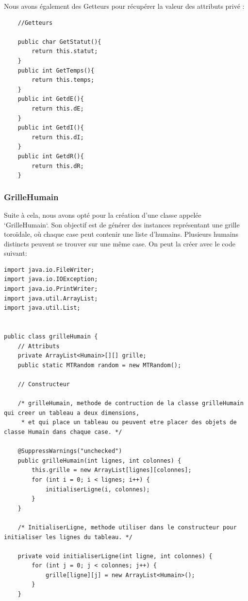 \documentclass[french]{article}
\begin{document}
Nous avons également des Getteurs pour récupérer la valeur des attributs privé :

\begin{lstlisting}
    //Getteurs

    public char GetStatut(){
        return this.statut;
    }
    public int GetTemps(){
        return this.temps;
    }
    public int GetdE(){
        return this.dE;
    }
    public int GetdI(){
        return this.dI;
    }
    public int GetdR(){
        return this.dR;
    }
\end{lstlisting}

\subsubsection{GrilleHumain}

Suite à cela, nous avons opté pour la création d'une classe appelée `GrilleHumain`. Son objectif est de générer des instances représentant une grille toroïdale, où chaque case peut contenir une liste d'humains. Plusieurs humains distincts peuvent se trouver sur une même case.
On peut la créer avec le code suivant:
\begin{lstlisting}
import java.io.FileWriter;
import java.io.IOException;
import java.io.PrintWriter;
import java.util.ArrayList;
import java.util.List;


public class grilleHumain {
    // Attributs
    private ArrayList<Humain>[][] grille;
    public static MTRandom random = new MTRandom();

    // Constructeur

    /* grilleHumain, methode de contruction de la classe grilleHumain qui creer un tableau a deux dimensions,
     * et qui place un tableau ou peuvent etre placer des objets de classe Humain dans chaque case. */

    @SuppressWarnings("unchecked")
    public grilleHumain(int lignes, int colonnes) {
        this.grille = new ArrayList[lignes][colonnes];
        for (int i = 0; i < lignes; i++) {
            initialiserLigne(i, colonnes);
        }
    }

    /* InitialiserLigne, methode utiliser dans le constructeur pour initialiser les lignes du tableau. */

    private void initialiserLigne(int ligne, int colonnes) {
        for (int j = 0; j < colonnes; j++) {
            grille[ligne][j] = new ArrayList<Humain>();
        }
    }
\end{lstlisting}
\end{document}
